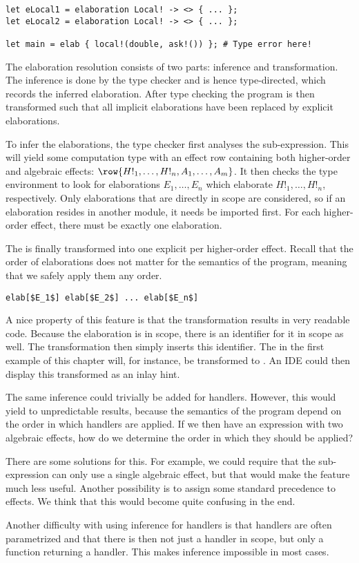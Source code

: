\begin{lstlisting}[language=elaine,style=fancy]
let eLocal1 = elaboration Local! -> <> { ... };
let eLocal2 = elaboration Local! -> <> { ... };

let main = elab { local!(double, ask!()) }; # Type error here!
\end{lstlisting}

The elaboration resolution consists of two parts: inference and transformation. The inference is done by the type checker and is hence type-directed, which records the inferred elaboration. After type checking the program is then transformed such that all implicit elaborations have been replaced by explicit elaborations.

To infer the elaborations, the type checker first analyses the sub-expression. This will yield some computation type with an effect row containing both higher-order and algebraic effects: $\row{H!_1, \dots, H!_n, A_1, \dots, A_m}$. It then checks the type environment to look for elaborations $E_1, \dots, E_n$ which elaborate $H!_1, \dots, H!_n$, respectively. Only elaborations that are directly in scope are considered, so if an elaboration resides in another module, it needs be imported first. For each higher-order effect, there must be exactly one elaboration.

The  is finally transformed into one explicit  per higher-order effect. Recall that the order of elaborations does not matter for the semantics of the program, meaning that we safely apply them any order.

\begin{lstlisting}[language=elaine,style=fancy]
elab[$E_1$] elab[$E_2$] ... elab[$E_n$]
\end{lstlisting}

A nice property of this feature is that the transformation results in very readable code. Because the elaboration is in scope, there is an identifier for it in scope as well. The transformation then simply inserts this identifier. The \elab in the first example of this chapter will, for instance, be transformed to . An IDE could then display this transformed  as an inlay hint.


The same inference could trivially be added for handlers. However, this would yield to unpredictable results, because the semantics of the program depend on the order in which handlers are applied. If we then have an expression with two algebraic effects, how do we determine the order in which they should be applied?

There are some solutions for this. For example, we could require that the sub-expression can only use a single algebraic effect, but that would make the feature much less useful. Another possibility is to assign some standard precedence to effects. We think that this would become quite confusing in the end.

Another difficulty with using inference for handlers is that handlers are often parametrized and that there is then not just a handler in scope, but only a function returning a handler. This makes inference impossible in most cases.